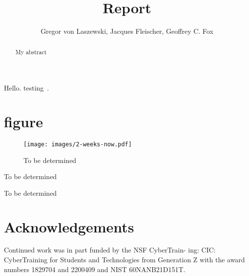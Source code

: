 \documentclass[11pt,twocolumn]{article}
\title{Report}
\author{Gregor von Laszewski, Jacques Fleischer, Geoffrey C. Fox}
\begin{document}
\maketitle

\begin{abstract}

My abstract

\end{abstract}

Hello. testing~\cite{las21openapi}.

\section{figure}

\begin{figure}[htb]
\centering\texttt{[image: images/2-weeks-now.pdf]}
\caption{To be determined}
\label{fig:tbd}
\end{figure}

\begin{table}[htb]

\caption{To be determined}
\label{tab:tbd}
\bigskip
\centering%
\end{table}

\begin{table}[htb]

\caption{To be determined}
\label{tab:tbdetermined}
\bigskip
\centering%
\end{table}

\section*{Acknowledgements}

Continued work was in part funded by the NSF CyberTrain-
ing: CIC: CyberTraining for Students and Technologies from
Generation Z with the award numbers 1829704 and 2200409
and NIST 60NANB21D151T.




\end{document}
